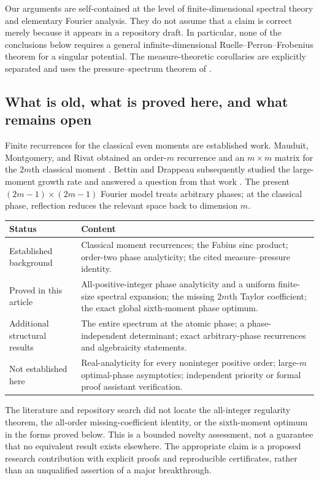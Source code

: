 \documentclass[11pt,a4paper]{article}
\numberwithin{equation}{section}
\theoremstyle{definition}
\theoremstyle{remark}
\begin{document}
Our arguments are self-contained at the level of finite-dimensional
spectral theory and elementary Fourier analysis. They do not assume that
a claim is correct merely because it appears in a repository draft. In
particular, none of the conclusions below requires a general
infinite-dimensional Ruelle--Perron--Frobenius theorem for a singular
potential. The measure-theoretic corollaries are explicitly separated and
uses the pressure--spectrum theorem of \cite{GKS}.

\subsection{What is old, what is proved here, and what remains open}
Finite recurrences for the classical even moments are established work.
Mauduit, Montgomery, and Rivat obtained an order-$m$ recurrence and an
$m\times m$ matrix for the $2m$th classical moment
\cite{MMR,MontgomeryTalk}. Bettin and Drappeau subsequently studied the
large-moment growth rate and answered a question from that work \cite{BD}.
The present $(2m-1)\times(2m-1)$ Fourier model treats arbitrary phases;
at the classical phase, reflection reduces the relevant space back to
dimension $m$.

\begin{center}
\begin{tabular}{@{}p{}p{}@{}}
\toprule
Status & Content \\
\midrule
Established background & Classical moment recurrences; the Fabius sinc product;
order-two phase analyticity; the cited measure--pressure identity.\\[2mm]
Proved in this article & All-positive-integer phase analyticity and a uniform
finite-size spectral expansion; the missing $2m$th Taylor coefficient;
the exact global sixth-moment phase optimum.\\[2mm]
Additional structural results & The entire spectrum at the atomic phase;
a phase-independent determinant; exact arbitrary-phase recurrences and
algebraicity statements.\\[2mm]
Not established here & Real-analyticity for every noninteger positive order;
large-$m$ optimal-phase asymptotics; independent priority or formal proof
assistant verification.\\
\bottomrule
\end{tabular}
\end{center}

The literature and repository search did not locate the all-integer
regularity theorem, the all-order missing-coefficient identity, or the
sixth-moment optimum in the forms proved below. This is a bounded novelty
assessment, not a guarantee that no equivalent result exists elsewhere.
The appropriate claim is a proposed research contribution with explicit
proofs and reproducible certificates, rather than an unqualified assertion
of a major breakthrough.
\end{document}
